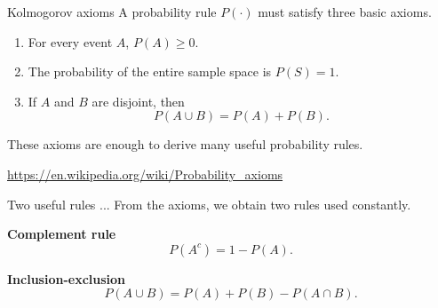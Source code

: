 \documentclass[12pt]{beamer}
\newcommand{\vocab}[1]{\textcolor{AggieMaroon}{\textbf{#1}}}
\begin{document}
\begin{frame}{}
\centering
{}
\end{frame}

\begin{frame}{}
\begin{block}{Kolmogorov axioms}
A probability rule $P(\cdot)$ must satisfy three basic axioms.

\begin{enumerate}
  \item For every event $A$, $P(A) \geq 0$.
  \item The probability of the entire sample space is $P(S)=1$.
  \item If $A$ and $B$ are disjoint, then
  \[
  P(A\cup B)=P(A)+P(B).
  \]
\end{enumerate}

\vspace{0.2cm}
These axioms are enough to derive many useful probability rules.
\end{block}
\url{https://en.wikipedia.org/wiki/Probability_axioms}
\end{frame}

\begin{frame}{}
\begin{block}{Two useful rules ...}
From the axioms, we obtain two rules used constantly.

\vspace{0.4cm}
\vocab{Complement rule}
\[
P(A^c)=1-P(A).
\]

\vocab{Inclusion-exclusion}
\[
P(A\cup B)=P(A)+P(B)-P(A\cap B).
\]
\end{block}
\end{frame}
\end{document}
